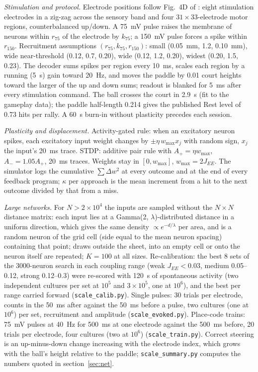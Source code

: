 \documentclass[12pt]{article}
\numberwithin{equation}{section}
\begin{document}
\emph{Stimulation and protocol.} Electrode positions follow Fig.~4D of \citet{Kagan2022}: eight stimulation electrodes in a zig-zag across the sensory band and four $31\times33$-electrode motor regions, counterbalanced up/down. A 75~mV pulse raises the membrane of neurons within $r_{75}$ of the electrode by $k_{75}$; a 150~mV pulse forces a spike within $r_{150}$. Recruitment assumptions $(r_{75},k_{75},r_{150})$: small (0.05~mm, 1.2, 0.10~mm), wide near-threshold (0.12, 0.7, 0.20), wide (0.12, 1.2, 0.20), widest (0.20, 1.5, 0.23). The decoder sums spikes per region every 10~ms, scales each region by a running (5~s) gain toward 20~Hz, and moves the paddle by 0.01 court heights toward the larger of the up and down sums; readout is blanked for 5~ms after every stimulation command. The ball crosses the court in 2.9~s (fit to the gameplay data); the paddle half-length 0.214 gives the published Rest level of 0.73 hits per rally. A 60~s burn-in without plasticity precedes each session.

\emph{Plasticity and displacement.} Activity-gated rule: when an excitatory neuron spikes, each excitatory input weight changes by $\pm\eta\,w_{\max}x_j$ with random sign, $x_j$ the input's 20~ms trace. STDP: additive pair rule with $A_+=\eta w_{\max}$, $A_-=1.05A_+$, 20~ms traces. Weights stay in $[0,w_{\max}]$, $w_{\max}=2J_{EE}$. The simulator logs the cumulative $\sum\Delta w^2$ at every outcome and at the end of every feedback program; $\kappa$ per approach is the mean increment from a hit to the next outcome divided by that from a miss.

\emph{Large networks.} For $N>2\times10^4$ the inputs are sampled without the $N\times N$ distance matrix: each input lies at a Gamma(2, $\lambda$)-distributed distance in a uniform direction, which gives the same density $\propto e^{-d/\lambda}$ per area, and is a random neuron of the grid cell (side equal to the mean neuron spacing) containing that point; draws outside the sheet, into an empty cell or onto the neuron itself are repeated; $K=100$ at all sizes. Re-calibration: the best 8 sets of the 3000-neuron search in each coupling range (weak $J_{EE}<0.03$, medium 0.05--0.12, strong 0.12--0.3) were re-scored with 120~s of spontaneous activity (two independent cultures per set at $10^5$ and $3\times10^5$, one at $10^6$), and the best per range carried forward (\texttt{scale\_calib.py}). Single pulses: 30 trials per electrode, counts in the 50~ms after against the 50~ms before a pulse, two cultures (one at $10^6$) per set, recruitment and amplitude (\texttt{scale\_evoked.py}). Place-code trains: 75~mV pulses at 40~Hz for 500~ms at one electrode against the 500~ms before, 20 trials per electrode, four cultures (two at $10^6$) (\texttt{scale\_train.py}). Correct steering is an up-minus-down change increasing with the electrode index, which grows with the ball's height relative to the paddle; \texttt{scale\_summary.py} computes the numbers quoted in section~\ref{sec:net}.
\end{document}

